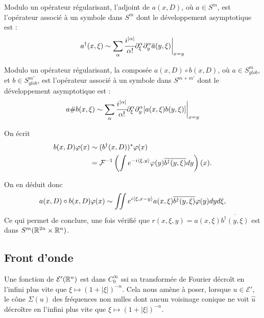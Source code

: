 \begin{corr}
	Modulo un opérateur régularisant, l'adjoint de $a(x,D)$, où $a \in S^m$, est l'opérateur associé à un symbole dans $S^m$ dont le développement asymptotique est :
	\begin{equation*}
		a^{\dagger}(x,\xi)\sim \sum_{\alpha}\cfrac{i^{|\alpha|}}{\alpha!}\partial^{\alpha}_{\xi}\partial^{\alpha}_y\overline{a}(y,\xi)\biggl|_{x=y}
	\end{equation*}
\end{corr}

\begin{corr}
	Modulo un opérateur régularisant, la composée $a(x,D)\circ b(x,D)$, où $a\in S^m_{glob}$, et $b \in S^{m'}_{glob}$, est l'opérateur associé à un symbole dans $S^{m+m'}$ dont le développement asymptotique est :
	\begin{equation}\label{eq:compPDO}
		a\#b(x,\xi)\sim \sum_{\alpha}\cfrac{i^{|\alpha|}}{\alpha!}\partial^{\alpha}_{\xi}\partial^{\alpha}_y[a(x,\xi)b(y,\xi)]\biggl|_{x=y}
	\end{equation}
\end{corr}
\begin{preuve}
	On écrit 
	\begin{align*}
		b(x,D)\varphi(x) &\sim (b^{\dagger}(x,D))^*\varphi(x)\\
		&= \mathcal{F}^{-1}\left(\int e^{-i\langle \xi,y\rangle}\varphi(y)\overline{b^{\dagger}(y,\xi)}dy\right)(x).
	\end{align*}
	
	On en déduit donc
	\begin{equation*}
		a(x,D)\circ b(x,D) \varphi(x) \sim \iint e^{i\langle \xi,x-y\rangle}a(x,\xi)\overline{b^{\dagger}(y,\xi)}\varphi(y)dyd\xi,
	\end{equation*}
	Ce qui permet de conclure, une fois vérifié que $r(x,\xi,y)=a(x,\xi)\overline{b^{\dagger}(y,\xi)}$ est dans $S^m(\mathbb{R}^{2n}\times \mathbb{R}^n)$.
\end{preuve}

\subsection{Front d'onde}

Une fonction de $\mathcal{E}'(\mathbb{R}^n)$ est dans $C^{\infty}_0$ ssi sa transformée de Fourier décroît en l'infini plus vite que $\xi \mapsto (1+|\xi|)^{-n}$. Cela nous amène à poser, lorsque $ u \in \mathcal{E}'$, le cône $\Sigma(u)$ des fréquences non nulles dont aucun voisinage conique ne voit $\hat{u}$ décroître en l'infini plus vite que $\xi \mapsto (1+|\xi|)^{-n}$. 


